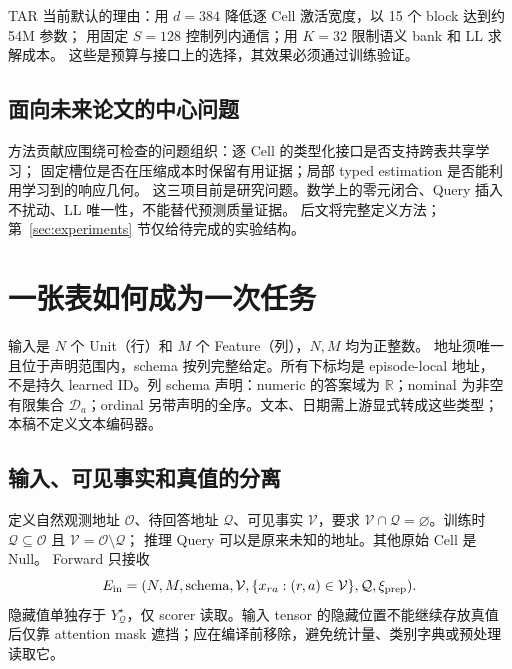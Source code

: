 \documentclass[11pt,UTF8,fontset=fandol]{ctexart}
\newcommand{\R}{\mathbb R}\newcommand{\V}{\mathcal V}\newcommand{\Q}{\mathcal Q}
\begin{document}
\begin{decision}
TAR 当前默认的理由：用 $d=384$ 降低逐 Cell 激活宽度，以 15 个 block 达到约 54M 参数；
用固定 $S=128$ 控制列内通信；用 $K=32$ 限制语义 bank 和 LL 求解成本。
这些是预算与接口上的选择，其效果必须通过训练验证。
\end{decision}

\subsection{面向未来论文的中心问题}
方法贡献应围绕可检查的问题组织：逐 Cell 的类型化接口是否支持跨表共享学习；
固定槽位是否在压缩成本时保留有用证据；局部 typed estimation 是否能利用学习到的响应几何。
这三项目前是研究问题。数学上的零元闭合、Query 插入不扰动、LL 唯一性，不能替代预测质量证据。
后文将完整定义方法；第~\ref{sec:experiments} 节仅给待完成的实验结构。

\section{一张表如何成为一次任务}
\label{sec:input}

输入是 $N$ 个 Unit（行）和 $M$ 个 Feature（列），$N,M$ 均为正整数。
地址须唯一且位于声明范围内，schema 按列完整给定。所有下标均是 episode-local 地址，
不是持久 learned ID。列 schema 声明：numeric 的答案域为 $\R$；nominal 为非空有限集合
$\mathcal D_a$；ordinal 另带声明的全序。文本、日期需上游显式转成这些类型；本稿不定义文本编码器。

\subsection{输入、可见事实和真值的分离}
定义自然观测地址 $\mathcal O$、待回答地址 $\Q$、可见事实 $\V$，要求
$\V\cap\Q=\varnothing$。训练时 $\Q\subseteq\mathcal O$ 且 $\V=\mathcal O\setminus\Q$；
推理 Query 可以是原来未知的地址。其他原始 Cell 是 Null。
Forward 只接收
\begin{equation}
 E_{\rm in}=(N,M,\text{schema},\V,\{x_{ra}:(r,a)\in\V\},\Q,\xi_{\rm prep}).
 \label{eq:input}
\end{equation}
隐藏值单独存于 $Y^\star_{\Q}$，仅 scorer 读取。输入 tensor 的隐藏位置不能继续存放真值后仅靠
attention mask 遮挡；应在编译前移除，避免统计量、类别字典或预处理读取它。
\end{document}
